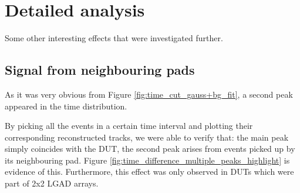 \section{Detailed analysis}\label{sec:detailed_analysis}

Some other interesting effects that were investigated further.

\subsection{Signal from neighbouring pads}\label{sec:multiple_peaks}

As it was very obvious from Figure \ref{fig:time_cut_gauss+bg_fit}, a second peak appeared in the time distribution.

By picking all the events in a certain time interval and plotting their corresponding reconstructed tracks, we were able to verify that: the main peak simply coincides with the DUT, the second peak arises from events picked up by its neighbouring pad. Figure \ref{fig:time_difference_multiple_peaks_highlight} is evidence of this.
Furthermore, this effect was only observed in DUTs which were part of 2x2 LGAD arrays.

